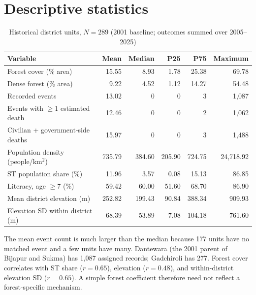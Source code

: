 \documentclass[11pt,a4paper]{article}
\begin{document}
\section{Descriptive statistics}
\begin{table}[htbp]
\centering\small
\caption{Historical district units, $N=289$ (2001 baseline; outcomes summed over 2005--2025)}
\begin{tabular}{lrrrrr}
\toprule
Variable & Mean & Median & P25 & P75 & Maximum\\
\midrule
Forest cover (\% area) & 15.55 & 8.93 & 1.78 & 25.38 & 69.78\\
Dense forest (\% area) & 9.22 & 4.52 & 1.12 & 14.27 & 54.48\\
Recorded events & 13.02 & 0 & 0 & 3 & 1,087\\
Events with $\geq$1 estimated death & 12.46 & 0 & 0 & 2 & 1,062\\
Civilian + government-side deaths & 15.97 & 0 & 0 & 3 & 1,488\\
Population density (people/km$^2$) & 735.79 & 384.60 & 205.90 & 724.75 & 24,718.92\\
ST population share (\%) & 11.96 & 3.57 & 0.08 & 15.13 & 86.85\\
Literacy, age $\geq$7 (\%) & 59.42 & 60.00 & 51.60 & 68.70 & 86.90\\
Mean district elevation (m) & 252.82 & 199.43 & 90.84 & 388.34 & 909.93\\
Elevation SD within district (m) & 68.39 & 53.89 & 7.08 & 104.18 & 761.60\\
\bottomrule
\end{tabular}
\label{tab:summary}
\end{table}

The mean event count is much larger than the median because 177 units have no matched event and a few units have many. Dantewara (the 2001 parent of Bijapur and Sukma) has 1,087 assigned records; Gadchiroli has 277. Forest cover correlates with ST share ($r=0.65$), elevation ($r=0.48$), and within-district elevation SD ($r=0.65$). A simple forest coefficient therefore need not reflect a forest-specific mechanism.
\end{document}
